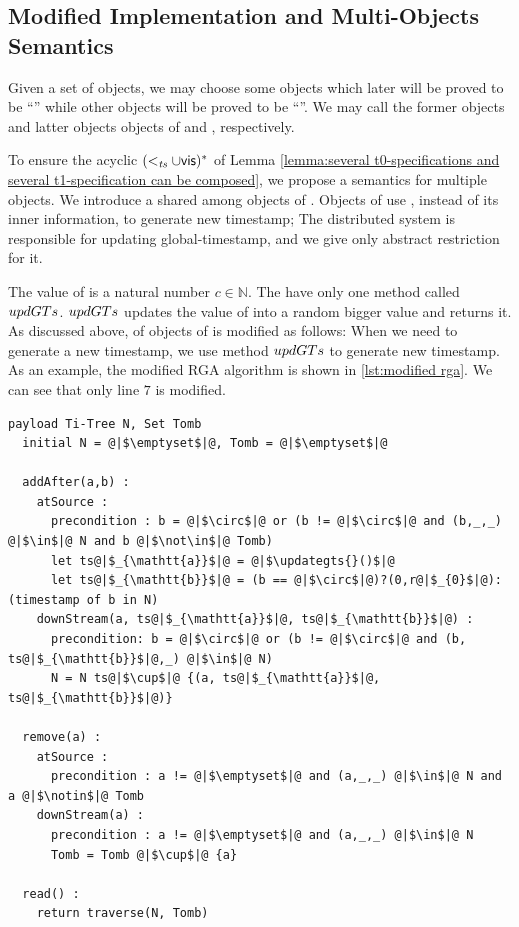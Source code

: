 




\subsection{Modified Implementation and Multi-Objects Semantics}
\label{subsec:smodified implementation and multi-objects semantics}

Given a set of objects, we may choose some objects which later will be proved to be ``\tzerolinearizable{}'' while other objects will be proved to be ``\tonelinearizable{}''. We may call the former objects and latter objects objects of \tzerolin{} and \tonelin{}, respectively.

To ensure the acyclic $(<_{\mathit{ts}} \cup \mathsf{vis})^*$ of Lemma \ref{lemma:several t0-specifications and several t1-specification can be composed}, we propose a semantics for multiple objects. %
We introduce a \gts{} shared among objects of \tonelin{}. Objects of \tonelin{} use \gts{}, instead of its inner information, to generate new timestamp; The distributed system is responsible for updating global-timestamp, and we give only abstract restriction for it.

The value of \gts{} is a natural number $c \in \mathbb{N}$. The \gts{} have only one method called $updGTs{}$. $updGTs{}$ updates the value of \gts{} into a random bigger value and returns it. As discussed above, \crdtimp{} of objects of \tonelin{} is modified as follows: When we need to generate a new timestamp, we use method $updGTs{}$ to generate new timestamp. As an example, the modified RGA algorithm is shown in \autoref{lst:modified rga}. We can see that only line $7$ is modified.

\begin{lstlisting}[caption={Pseudo-code of the Modified RGA}, captionpos=b,label={lst:modified rga}]
  payload Ti-Tree N, Set Tomb
  initial N = @|$\emptyset$|@, Tomb = @|$\emptyset$|@

  addAfter(a,b) :
    atSource :
      precondition : b = @|$\circ$|@ or (b != @|$\circ$|@ and (b,_,_) @|$\in$|@ N and b @|$\not\in$|@ Tomb)
      let ts@|$_{\mathtt{a}}$|@ = @|$\updategts{}()$|@
      let ts@|$_{\mathtt{b}}$|@ = (b == @|$\circ$|@)?(0,r@|$_{0}$|@):(timestamp of b in N)
    downStream(a, ts@|$_{\mathtt{a}}$|@, ts@|$_{\mathtt{b}}$|@) :
      precondition: b = @|$\circ$|@ or (b != @|$\circ$|@ and (b, ts@|$_{\mathtt{b}}$|@,_) @|$\in$|@ N)
      N = N ts@|$\cup$|@ {(a, ts@|$_{\mathtt{a}}$|@, ts@|$_{\mathtt{b}}$|@)}

  remove(a) :
    atSource :
      precondition : a != @|$\emptyset$|@ and (a,_,_) @|$\in$|@ N and a @|$\notin$|@ Tomb
    downStream(a) :
      precondition : a != @|$\emptyset$|@ and (a,_,_) @|$\in$|@ N
      Tomb = Tomb @|$\cup$|@ {a}

  read() :
    return traverse(N, Tomb)
\end{lstlisting}

